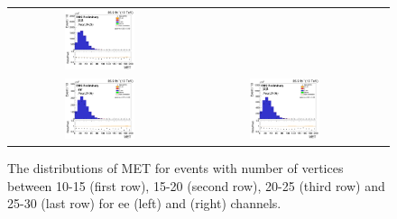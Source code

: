 \begin{figure}[ht]
\begin{center}
\begin{tabular}{ccc}
      \includegraphics[width=0.4\textwidth]{figures/tW/fig/Nvtx/20-25/mumu/H_MET_Et.png}\\
      \includegraphics[width=0.4\textwidth]{figures/tW/fig/Nvtx/25-30/ee/H_MET_Et.png}&
      \includegraphics[width=0.4\textwidth]{figures/tW/fig/Nvtx/25-30/mumu/H_MET_Et.png}\\
    \end{tabular}
    \caption{The distributions of MET for events with number of vertices between 10-15 (first row), 15-20 (second row), 20-25 (third row) and 25-30 (last row) for ee (left) and \mumu (right) channels.
    \label{fig:step1_MET_Nvtx}}
  \end{center}
\end{figure}


